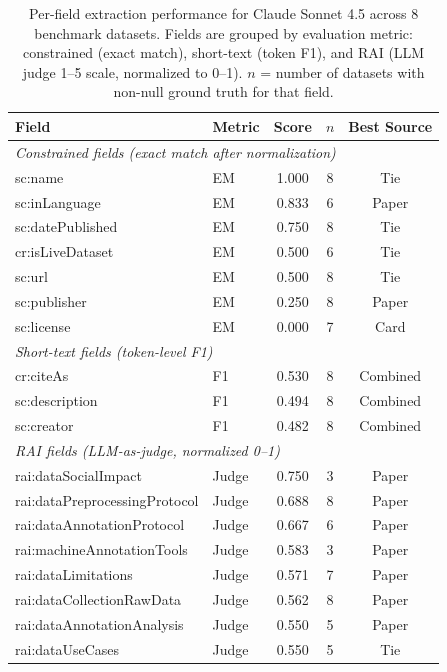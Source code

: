\begin{table}[h]
\centering
\caption{Per-field extraction performance for Claude Sonnet 4.5 across 8 benchmark datasets. Fields are grouped by evaluation metric: constrained (exact match), short-text (token F1), and RAI (LLM judge 1--5 scale, normalized to 0--1). $n$ = number of datasets with non-null ground truth for that field.}
\label{tab:per-field}
\small
\begin{tabular}{llccc}
\toprule
Field & Metric & Score & $n$ & Best Source \\
\midrule
\multicolumn{5}{l}{\textit{Constrained fields (exact match after normalization)}} \\
\quad sc:name & EM & 1.000 & 8 & Tie \\
\quad sc:inLanguage & EM & 0.833 & 6 & Paper \\
\quad sc:datePublished & EM & 0.750 & 8 & Tie \\
\quad cr:isLiveDataset & EM & 0.500 & 6 & Tie \\
\quad sc:url & EM & 0.500 & 8 & Tie \\
\quad sc:publisher & EM & 0.250 & 8 & Paper \\
\quad sc:license & EM & 0.000 & 7 & Card \\
\midrule
\multicolumn{5}{l}{\textit{Short-text fields (token-level F1)}} \\
\quad cr:citeAs & F1 & 0.530 & 8 & Combined \\
\quad sc:description & F1 & 0.494 & 8 & Combined \\
\quad sc:creator & F1 & 0.482 & 8 & Combined \\
\midrule
\multicolumn{5}{l}{\textit{RAI fields (LLM-as-judge, normalized 0--1)}} \\
\quad rai:dataSocialImpact & Judge & 0.750 & 3 & Paper \\
\quad rai:dataPreprocessingProtocol & Judge & 0.688 & 8 & Paper \\
\quad rai:dataAnnotationProtocol & Judge & 0.667 & 6 & Paper \\
\quad rai:machineAnnotationTools & Judge & 0.583 & 3 & Paper \\
\quad rai:dataLimitations & Judge & 0.571 & 7 & Paper \\
\quad rai:dataCollectionRawData & Judge & 0.562 & 8 & Paper \\
\quad rai:dataAnnotationAnalysis & Judge & 0.550 & 5 & Paper \\
\quad rai:dataUseCases & Judge & 0.550 & 5 & Tie \\

\end{tabular}
\end{table}
